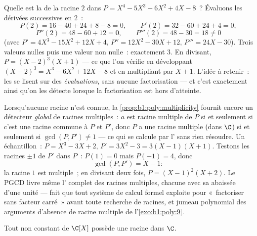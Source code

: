 \begin{example}\label{ex:b1:poly:multexample}
Quelle est la  de la racine $2$ dans $P = X^4 - 5X^3 +
6X^2 + 4X - 8$~? Évaluons les dérivées successives en $2$~:
\[
P(2) = 16 - 40 + 24 + 8 - 8 = 0, \qquad
P'(2) = 32 - 60 + 24 + 4 = 0,
\]
\[
P''(2) = 48 - 60 + 12 = 0, \qquad
P'''(2) = 48 - 30 = 18 \neq 0
\]
(avec $P' = 4X^3 - 15X^2 + 12X + 4$, $P'' = 12X^2 - 30X + 12$,
$P''' = 24X - 30$). Trois valeurs nulles puis une valeur non nulle~:
 exactement $3$. En divisant, $P = (X - 2)^3(X + 1)$ ---
ce que l'on vérifie en développant $(X-2)^3 = X^3 - 6X^2 + 12X - 8$
et en multipliant par $X + 1$. L'idée à retenir~: les 
se lisent sur des \emph{évaluations}, sans aucune factorisation ---
et c'est exactement ainsi qu'on les détecte lorsque la factorisation
est hors d'atteinte.
\end{example}

\begin{example}\label{ex:b1:poly:gcdmultiple}
Lorsqu'aucune racine n'est connue,
la \cref{prop:b1:poly:multiplicity} fournit encore un détecteur
\emph{global} de racines multiples~: $a$ est racine multiple de $P$
si et seulement si c'est une racine commune à $P$ et $P'$, donc $P$
a une racine multiple (dans $\C$) si et seulement si $\gcd(P, P')
\neq 1$ --- ce qui se calcule par l' sans rien
résoudre. Un échantillon~: $P = X^3 - 3X + 2$, $P' = 3X^2 - 3 = 3(X
- 1)(X + 1)$. Testons les racines $\pm1$ de $P'$ dans $P$~: $P(1) =
0$ mais $P(-1) = 4$, donc
\[
\gcd(P, P') = X - 1 :
\]
la racine $1$ est multiple~; en divisant deux fois, $P = (X - 1)^2(X
+ 2)$. Le PGCD livre même l' complet des racines multiples,
chacune avec sa  abaissée d'une unité --- fait que tout
système de calcul formel exploite pour «~factoriser sans facteur
carré~» avant toute recherche de racines, et jumeau polynomial des
arguments d'absence de racine multiple de l'\cref{exo:b1:poly:9}.
\end{example}

\begin{theorem}\label{thm:b1:poly:fta}
Tout  non constant de $\C[X]$ possède une racine dans
$\C$.
\end{theorem}
\admitted

